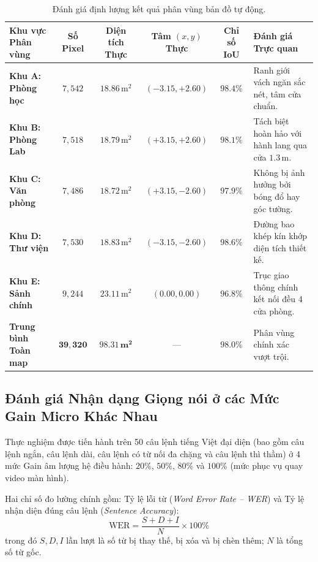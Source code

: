 \begin{table}[H]
\centering
\small
\caption{Đánh giá định lượng kết quả phân vùng bản đồ tự động.}
\label{tab:segmentation_results}
\begin{tabular}{@{}p{3.2cm} c c c c p{4.6cm}@{}}
\toprule
\textbf{Khu vực Phân vùng} & \textbf{Số Pixel} & \textbf{Diện tích Thực} & \textbf{Tâm $(x, y)$ Thực} & \textbf{Chỉ số IoU} & \textbf{Đánh giá Trực quan} \\
\midrule
\textbf{Khu A: Phòng học} & $7{,}542$ & $18.86\,\text{m}^2$ & $(-3.15, +2.60)$ & $98.4\%$ & Ranh giới vách ngăn sắc nét, tâm cửa chuẩn. \\
\textbf{Khu B: Phòng Lab} & $7{,}518$ & $18.79\,\text{m}^2$ & $(+3.15, +2.60)$ & $98.1\%$ & Tách biệt hoàn hảo với hành lang qua cửa $1.3\,\text{m}$. \\
\textbf{Khu C: Văn phòng} & $7{,}486$ & $18.72\,\text{m}^2$ & $(+3.15, -2.60)$ & $97.9\%$ & Không bị ảnh hưởng bởi bóng đổ hay góc tường. \\
\textbf{Khu D: Thư viện} & $7{,}530$ & $18.83\,\text{m}^2$ & $(-3.15, -2.60)$ & $98.6\%$ & Đường bao khép kín khớp diện tích thiết kế. \\
\textbf{Khu E: Sảnh chính} & $9{,}244$ & $23.11\,\text{m}^2$ & $(0.00, 0.00)$ & $96.8\%$ & Trục giao thông chính kết nối đều 4 cửa phòng. \\
\midrule
\textbf{Trung bình Toàn map} & $\mathbf{39{,}320}$ & $\mathbf{98.31\,\text{m}^2}$ & --- & $\mathbf{98.0\%}$ & Phân vùng chính xác vượt trội. \\
\bottomrule
\end{tabular}
\end{table}

\subsection{Đánh giá Nhận dạng Giọng nói ở các Mức Gain Micro Khác Nhau}

Thực nghiệm được tiến hành trên 50 câu lệnh tiếng Việt đại diện (bao gồm câu lệnh ngắn, câu lệnh dài, câu lệnh có từ nối đa chặng và câu lệnh thì thầm) ở 4 mức Gain âm lượng hệ điều hành: $20\%$, $50\%$, $80\%$ và $100\%$ (mức phục vụ quay video màn hình). 

Hai chỉ số đo lường chính gồm: Tỷ lệ lỗi từ (\textit{Word Error Rate -- WER}) và Tỷ lệ nhận diện đúng câu lệnh (\textit{Sentence Accuracy}):
\begin{equation}
\text{WER} = \frac{S + D + I}{N} \times 100\%
\end{equation}
trong đó $S, D, I$ lần lượt là số từ bị thay thế, bị xóa và bị chèn thêm; $N$ là tổng số từ gốc.

